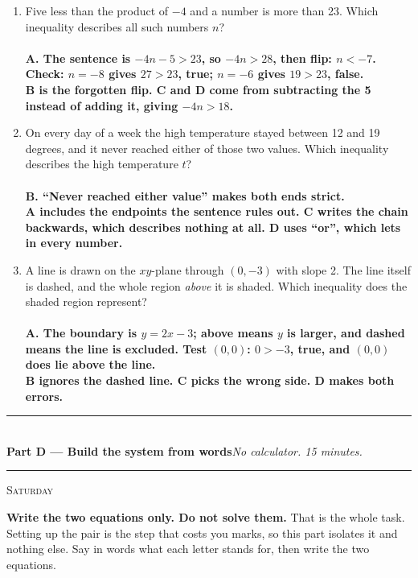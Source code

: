 \documentclass[11pt,a4paper]{article}
\newif\ifANSWERS
\newcommand{\PartHead}[2]{%
  \vspace{6pt}
  {\color{navy}\rule{\textwidth}{0.8pt}}\\[2pt]
  {\large\bfseries\color{navy}#1}\hfill{\small\itshape #2}\\[-4pt]
  {\color{navy}\rule{\textwidth}{0.4pt}}
  \vspace{4pt}
}
\newcommand{\sitting}[1]{{\footnotesize\textsc{\color{navy}#1}}\par\vspace{2pt}}
\newcommand{\ans}[1]{\ {\color{keyred}\bfseries #1}}
\newcommand{\ans}[1]{}
\begin{document}
\begin{enumerate}[leftmargin=20pt,itemsep=9pt]
\item Five less than the product of $-4$ and a number is more than 23. Which inequality describes all such numbers $n$?\\
  \ans{\\ A. The sentence is $-4n-5>23$, so $-4n>28$, then flip: $n<-7$. Check: $n=-8$ gives $27>23$, true; $n=-6$ gives $19>23$, false. \\ B is the forgotten flip. C and D come from subtracting the 5 instead of adding it, giving $-4n>18$.}

\item On every day of a week the high temperature stayed between 12 and 19 degrees, and it never reached either of those two values. Which inequality describes the high temperature $t$?\\
  \ans{\\ B. ``Never reached either value'' makes both ends strict. \\ A includes the endpoints the sentence rules out. C writes the chain backwards, which describes nothing at all. D uses ``or'', which lets in every number.}

\item A line is drawn on the $xy$-plane through $(0,-3)$ with slope 2. The line itself is dashed, and the whole region \emph{above} it is shaded. Which inequality does the shaded region represent?\\
  \ans{\\ A. The boundary is $y=2x-3$; above means $y$ is larger, and dashed means the line is excluded. Test $(0,0)$: $0>-3$, true, and $(0,0)$ does lie above the line. \\ B ignores the dashed line. C picks the wrong side. D makes both errors.}

\end{enumerate}

\ifANSWERS\else\newpage\fi
\PartHead{Part D --- Build the system from words}{No calculator. 15 minutes.}
\sitting{Saturday}
\textbf{Write the two equations only. Do not solve them.} That is the whole task.
Setting up the pair is the step that costs you marks, so this part isolates it and
nothing else. Say in words what each letter stands for, then write the two equations.
\end{document}
